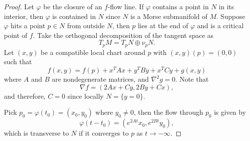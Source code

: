 \documentclass[10pt,a4paper]{amsart}
\begin{document}
\begin{proof}
    Let $\varphi$ be the closure of an $f$-flow line. If $\varphi$ contains a point in $N$ in its interior, then $\varphi$ is contained in $N$ since $N$ is a Morse submanifold of $M$. Suppose $\varphi$ hits a point $p\in N$ from outside $N$, then $p$ lies at the end of $\varphi$ and is a critical point of $f$. Take the orthogonal decomposition of the tangent space as
    \[
    T_pM=T_pN\oplus \nu_pN.
    \]
    Let $(x,y)$ be a compatible local chart around $p$ with $(x,y)(p)=(0,0)$ such that
    \[
    f(x,y)=f(p)+x^TAx+y^TBy+x^TCy+g(x,y)
    \]
    where $A$ and $B$ are nondegenerate matrices, and $\nabla^2 g=0$. Note that
    \[
    \nabla f=(2Ax+Cy,2By+Cx),
    \]
    and therefore, $C=0$ since locally $N=\{y=0\}$.

    Pick $p_0=\varphi(t_0)=(x_0,y_0)$ where $y_0\neq0$, then the flow through $p_0$ is given by
    \[
    \varphi(t-t_0)=(e^{2At}x_0,e^{2Bt}y_0),
    \]
    which is transverse to $N$ if it converges to $p$ as $t\to-\infty$.
\end{proof}
\end{document}
